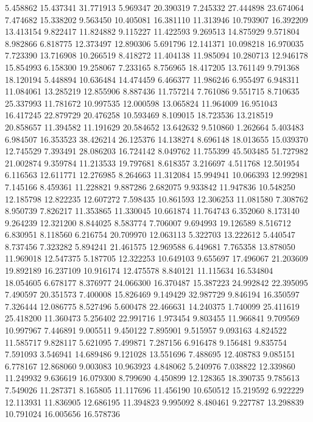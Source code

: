 5.458862
15.437341
31.771913
5.969347
20.390319
7.245332
27.444898
23.674064
7.474682
15.338202
9.563450
10.405081
16.381110
11.313946
10.793907
16.392209
13.413154
9.822417
11.824882
9.115227
11.422593
9.269513
14.875929
9.571804
8.982866
6.818775
12.373497
12.890306
5.691796
12.141371
10.098218
16.970035
7.723390
13.716908
10.266519
8.418272
11.404138
11.985094
10.280713
12.946178
15.854993
6.158300
19.258067
7.233165
8.756965
18.417205
13.761149
9.791368
18.120194
5.448894
10.636484
14.474459
6.466377
11.986246
6.955497
6.948311
11.084061
13.285219
12.855906
8.887436
11.757214
7.761086
9.551715
8.710635
25.337993
11.781672
10.997535
12.000598
13.065824
11.964009
16.951043
16.417245
22.879729
20.476258
10.593469
8.109015
18.723536
13.218519
20.858657
11.394582
11.191629
20.584652
13.642632
9.510860
1.262664
5.403483
6.984507
16.353523
38.426214
26.125376
14.138274
8.696148
18.013655
15.039370
12.745529
7.393491
28.086203
16.724142
8.049762
11.755399
45.503485
51.727982
21.002874
9.359784
11.213533
19.797681
8.618357
3.216697
4.511768
12.501954
6.116563
12.611771
12.276985
8.264663
11.312084
15.994941
10.066393
12.992981
7.145166
8.459361
11.228821
9.887286
2.682075
9.933842
11.947836
10.548250
12.185798
12.822235
12.607272
7.598435
10.861593
12.306253
11.081580
7.308762
8.950739
7.826217
11.353865
11.330045
10.661874
11.764743
6.352060
8.173140
9.264239
12.321200
8.844025
8.583774
7.706007
9.694993
19.126589
8.516712
6.830951
8.118560
6.216754
20.709970
12.063113
5.322703
13.222612
5.440547
8.737456
7.323282
5.894241
21.461575
12.969588
6.449681
7.765358
13.878050
11.969018
12.547375
5.187705
12.322253
10.649103
9.655697
17.496067
21.203609
19.892189
16.237109
10.916174
12.475578
8.840121
11.115634
16.534804
18.054605
6.678177
8.376977
24.066300
16.370487
15.387223
24.992842
22.395095
7.490597
20.351573
7.400008
15.826469
9.149429
32.987729
9.846194
16.350597
7.326444
12.086775
8.527496
5.600478
22.466631
14.240375
1.740099
25.411619
25.418200
11.360473
5.256402
22.991716
1.973454
9.803455
11.966841
9.709569
10.997967
7.446891
9.005511
9.450122
7.895901
9.515957
9.093163
4.824522
11.585717
9.828117
5.621095
7.499871
7.287156
6.916478
9.156481
9.835754
7.591093
3.546941
14.689486
9.121028
13.551696
7.488695
12.408783
9.085151
6.778167
12.868060
9.003083
10.963923
4.848062
5.240976
7.038822
12.339860
11.249932
9.636619
16.079300
8.799690
4.450899
12.128365
18.390735
9.785613
7.549026
11.287371
8.165805
11.117696
11.456190
10.650512
15.219592
6.922229
12.113931
11.836905
12.686195
11.394823
9.995092
8.480461
9.227787
13.298839
10.791024
16.005656
16.578736
